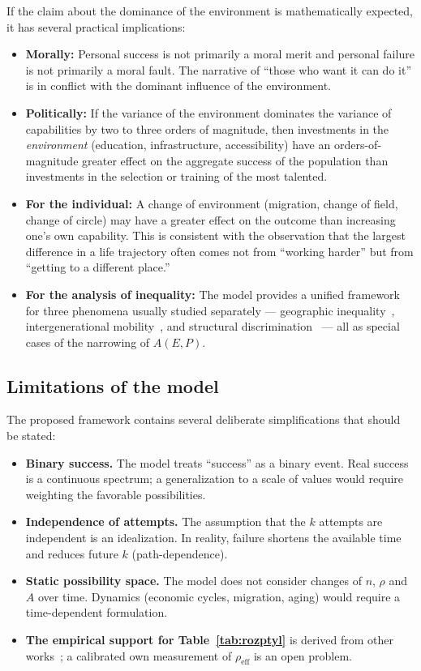 \documentclass[12pt,a4paper]{article}
\begin{document}
If the claim about the dominance of the environment is mathematically expected, it has several practical implications:

\begin{itemize}
    \item \textbf{Morally:} Personal success is not primarily a moral merit and personal failure is not primarily a moral fault. The narrative of ``those who want it can do it'' is in conflict with the dominant influence of the environment.
    \item \textbf{Politically:} If the variance of the environment dominates the variance of capabilities by two to three orders of magnitude, then investments in the \emph{environment} (education, infrastructure, accessibility) have an orders-of-magnitude greater effect on the aggregate success of the population than investments in the selection or training of the most talented.
    \item \textbf{For the individual:} A change of environment (migration, change of field, change of circle) may have a greater effect on the outcome than increasing one's own capability. This is consistent with the observation that the largest difference in a life trajectory often comes not from ``working harder'' but from ``getting to a different place.''
    \item \textbf{For the analysis of inequality:} The model provides a unified framework for three phenomena usually studied separately — geographic inequality~\cite{milanovic2015}, intergenerational mobility~\cite{chetty2014}, and structural discrimination~\cite{bourdieu1986} — all as special cases of the narrowing of $A(E,P)$.
\end{itemize}

\subsection{Limitations of the model}

The proposed framework contains several deliberate simplifications that should be stated:
\begin{itemize}
    \item \textbf{Binary success.} The model treats ``success'' as a binary event. Real success is a continuous spectrum; a generalization to a scale of values would require weighting the favorable possibilities.
    \item \textbf{Independence of attempts.} The assumption that the $k$ attempts are independent is an idealization. In reality, failure shortens the available time and reduces future $k$ (path-dependence).
    \item \textbf{Static possibility space.} The model does not consider changes of $n$, $\rho$ and $A$ over time. Dynamics (economic cycles, migration, aging) would require a time-dependent formulation.
    \item \textbf{The empirical support for Table~\ref{tab:rozptyl}} is derived from other works~\cite{milanovic2015,chetty2014,hunter1998,pluchino2018}; a calibrated own measurement of $\rho_{\text{eff}}$ is an open problem.
\end{itemize}
\end{document}
